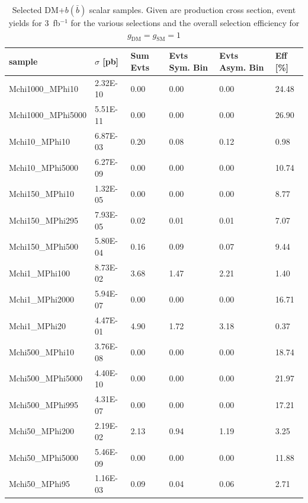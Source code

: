 \begin{table}[h!]
\small
\centering
\begin{tabular}{l|lllll}
\hline
sample             & $\sigma$ [pb] & Sum Evts       & Evts Sym. Bin & Evts Asym. Bin & Eff  [\%]   \\\hline
Mchi1000\_MPhi10    & 2.32E-10 & 0.00 & 0.00 & 0.00 & 24.48 \\
Mchi1000\_MPhi5000 & 5.51E-11 & 0.00 & 0.00 & 0.00 & 26.90 \\
Mchi10\_MPhi10     & 6.87E-03 & 0.20 & 0.08 & 0.12 & 0.98  \\
Mchi10\_MPhi5000   & 6.27E-09 & 0.00 & 0.00 & 0.00 & 10.74 \\
Mchi150\_MPhi10    & 1.32E-05 & 0.00 & 0.00 & 0.00 & 8.77  \\
Mchi150\_MPhi295   & 7.93E-05 & 0.02 & 0.01 & 0.01 & 7.07  \\
Mchi150\_MPhi500   & 5.80E-04 & 0.16 & 0.09 & 0.07 & 9.44  \\
Mchi1\_MPhi100     & 8.73E-02 & 3.68 & 1.47 & 2.21 & 1.40  \\
Mchi1\_MPhi2000    & 5.94E-07 & 0.00 & 0.00 & 0.00 & 16.71 \\
Mchi1\_MPhi20      & 4.47E-01 & 4.90 & 1.72 & 3.18 & 0.37  \\
Mchi500\_MPhi10    & 3.76E-08 & 0.00 & 0.00 & 0.00 & 18.74 \\
Mchi500\_MPhi5000  & 4.40E-10 & 0.00 & 0.00 & 0.00 & 21.97 \\
Mchi500\_MPhi995   & 4.31E-07 & 0.00 & 0.00 & 0.00 & 17.21 \\
Mchi50\_MPhi200    & 2.19E-02 & 2.13 & 0.94 & 1.19 & 3.25  \\
Mchi50\_MPhi5000   & 5.46E-09 & 0.00 & 0.00 & 0.00 & 11.88 \\
Mchi50\_MPhi95     & 1.16E-03 & 0.09 & 0.04 & 0.06 & 2.71 \\
\hline
\end{tabular}
\caption{Selected DM+$b(\bar{b})$ scalar samples. Given are production cross section, event yields for 3~fb$^{-1 }$ for the various selections and the overall selection efficiency for $g_\textrm{DM}=g_\textrm{SM}=1$ \label{tab:dmbb_S}}
\end{table}

